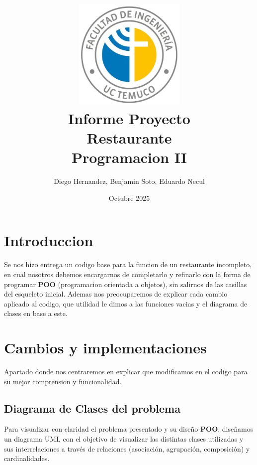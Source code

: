 \documentclass[a4paper,12pt]{article}
\title {\includegraphics[width=0.4\textwidth]{Ing_Uni.jpg}\\[2ex]{\textbf{Informe Proyecto\\ Restaurante}\\[1.5ex] Programacion II\\[20ex]}}
\author{Diego Hernandez, Benjamin Soto, Eduardo Necul}
\date{Octubre 2025}
\begin{document}
\maketitle

\newpage
\tableofcontents
\newpage

\section{Introduccion}

Se nos hizo entrega un codigo base para la funcion de un restaurante incompleto, en cual nosotros debemos encargarnos de completarlo y refinarlo con la forma de programar \textbf{POO} (programacion orientada a objetos), sin salirnos de las casillas del esqueleto inicial. Ademas nos preocuparemos de explicar cada cambio aplicado al codigo, que utilidad le dimos a las funciones vacias y el diagrama de clases en base a este.

\section{Cambios y implementaciones}

Apartado donde nos centraremos en explicar que modificamos en el codigo para su mejor comprension y funcionalidad.

\subsection{Diagrama de Clases del problema}

Para visualizar con claridad el problema presentado y su diseño \textbf{POO}, diseñamos un diagrama UML con el objetivo de visualizar las distintas clases utilizadas y sus interrelaciones a través de relaciones (asociación, agrupación, composición) y cardinalidades.
\end{document}
